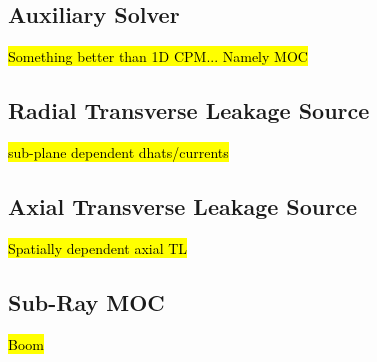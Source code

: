 \subsection{Auxiliary Solver}

\hl{Something better than 1D CPM... Namely MOC}

\subsection{Radial Transverse Leakage Source}

\hl{sub-plane dependent dhats/currents}

\subsection{Axial Transverse Leakage Source}

\hl{Spatially dependent axial TL}

\subsection{Sub-Ray MOC}

\hl{Boom}